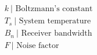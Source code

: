 \documentclass[preview]{standalone}
\begin{document}
\begin{align*}
&k\  \text{| Boltzmann's constant} \\ &T_s\  \text{| System temperature} \\ &B_n\  \text{| Receiver bandwidth} \\ &F\  \text{| Noise factor}
\end{align*}
\end{document}
